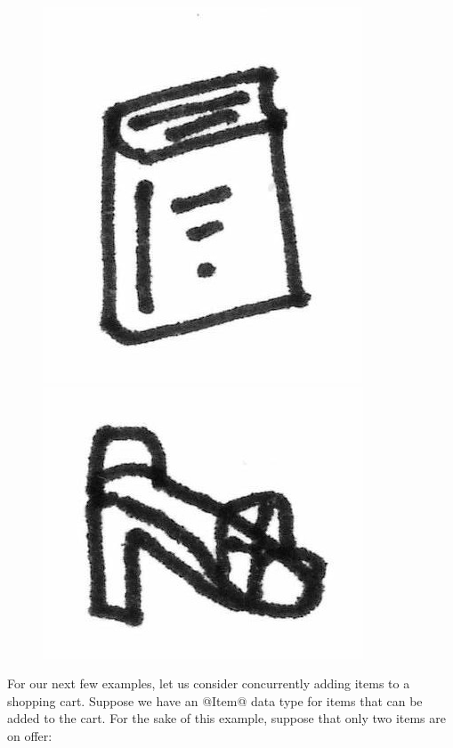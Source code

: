 \ifdefined\DISSERTATION
\begin{figure}
\vspace{-2em}
\begin{center}
  \includegraphics[scale=0.2]{../illustrations/book}
\end{center}
\begin{center}
  \includegraphics[scale=0.2]{../illustrations/shoe}
\end{center}
\vspace{-3em}
\end{figure}
\fi

For our next few examples, let us consider concurrently adding items
to a shopping cart.  Suppose we have an @Item@ data type for items
that can be added to the cart.  For the sake of this example, suppose
that only two items are on offer:


